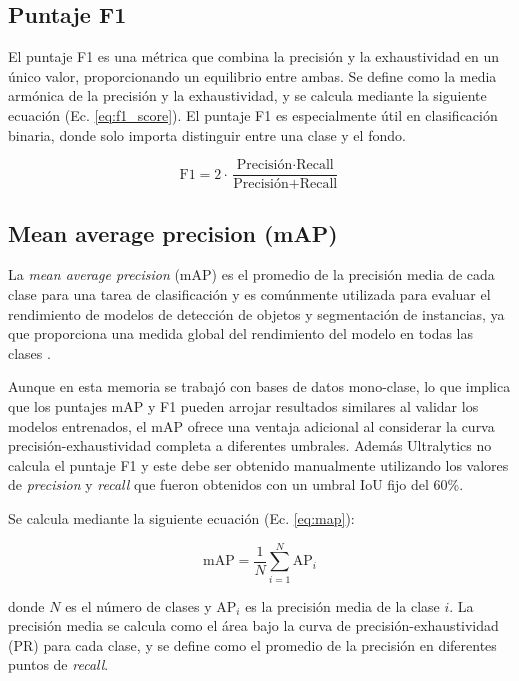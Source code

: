 \subsection{Puntaje F1}
El puntaje F1 es una métrica que combina la precisión y la exhaustividad en un único valor, proporcionando un equilibrio entre ambas. Se define como la media armónica de la precisión y la exhaustividad, y se calcula mediante la siguiente ecuación (Ec. \ref{eq:f1_score}). El puntaje F1 es especialmente útil en clasificación binaria, donde solo importa distinguir entre una clase y el fondo.

\begin{equation}
\text{F1} = 2 \cdot \dfrac{\text{Precisión} \cdot \text{Recall}}{\text{Precisión} + \text{Recall}}
\label{eq:f1_score}
\end{equation}

\subsection{Mean average precision (mAP)}
La \textit{mean average precision} (mAP) es el promedio de la precisión media de cada clase para una tarea de clasificación y es comúnmente utilizada para evaluar el rendimiento de modelos de detección de objetos y segmentación de instancias, ya que proporciona una medida global del rendimiento del modelo en todas las clases \cite{v7labs-mAP}.

Aunque en esta memoria se trabajó con bases de datos mono-clase, lo que implica que los puntajes mAP y F1 pueden arrojar resultados similares al validar los modelos entrenados, el mAP ofrece una ventaja adicional al considerar la curva precisión-exhaustividad completa a diferentes umbrales. Además Ultralytics no calcula el puntaje F1 y este debe ser obtenido manualmente utilizando los valores de \textit{precision} y \textit{recall} que fueron obtenidos con un umbral IoU fijo del 60\%.

Se calcula mediante la siguiente ecuación (Ec. \ref{eq:map}):

\begin{equation}
\text{mAP} = \dfrac{1}{N} \sum_{i=1}^{N} \text{AP}_i
\label{eq:map}
\end{equation}

donde $N$ es el número de clases y $\text{AP}_i$ es la precisión media de la clase $i$. La precisión media se calcula como el área bajo la curva de precisión-exhaustividad (PR) para cada clase, y se define como el promedio de la precisión en diferentes puntos de \textit{recall}. 

